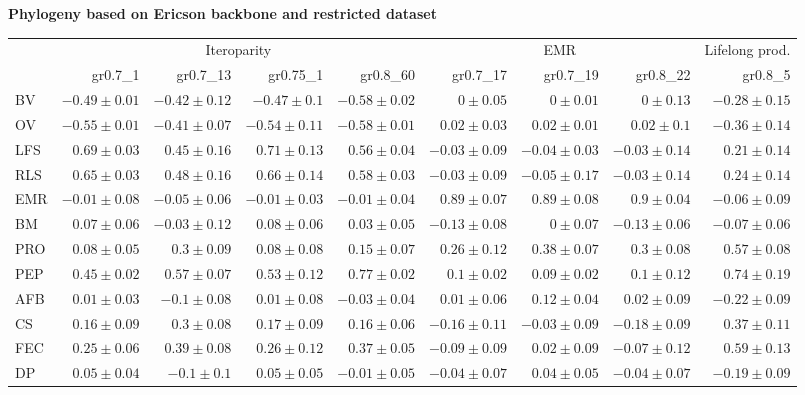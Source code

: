 \begin{landscape}
\begin{table}
\begin{footnotesize}
\textbf{Phylogeny based on Ericson backbone and restricted dataset}

\begin{tabular}{@{}l|rrrr|rrr|r@{}}
\toprule
 & \multicolumn{4}{c|}{Iteroparity} & \multicolumn{3}{c|}{EMR} & \multicolumn{1}{c}{Lifelong prod.}\\
 & gr0.7\_1 & gr0.7\_13 & gr0.75\_1 & gr0.8\_60 & gr0.7\_17 & gr0.7\_19 & gr0.8\_22 & gr0.8\_5\\
\midrule
BV & $-0.49 \pm 0.01$ & $-0.42 \pm 0.12$ & $-0.47 \pm 0.1$ & $-0.58 \pm 0.02$ & $0 \pm 0.05$ & $0 \pm 0.01$ & $0 \pm 0.13$ & $-0.28 \pm 0.15$\\
OV & $-0.55 \pm 0.01$ & $-0.41 \pm 0.07$ & $-0.54 \pm 0.11$ & $-0.58 \pm 0.01$ & $0.02 \pm 0.03$ & $0.02 \pm 0.01$ & $0.02 \pm 0.1$ & $-0.36 \pm 0.14$\\
LFS & $0.69 \pm 0.03$ & $0.45 \pm 0.16$ & $0.71 \pm 0.13$ & $0.56 \pm 0.04$ & $-0.03 \pm 0.09$ & $-0.04 \pm 0.03$ & $-0.03 \pm 0.14$ & $0.21 \pm 0.14$\\
RLS & $0.65 \pm 0.03$ & $0.48 \pm 0.16$ & $0.66 \pm 0.14$ & $0.58 \pm 0.03$ & $-0.03 \pm 0.09$ & $-0.05 \pm 0.17$ & $-0.03 \pm 0.14$ & $0.24 \pm 0.14$\\
EMR & $-0.01 \pm 0.08$ & $-0.05 \pm 0.06$ & $-0.01 \pm 0.03$ & $-0.01 \pm 0.04$ & $0.89 \pm 0.07$ & $0.89 \pm 0.08$ & $0.9 \pm 0.04$ & $-0.06 \pm 0.09$\\
BM & $0.07 \pm 0.06$ & $-0.03 \pm 0.12$ & $0.08 \pm 0.06$ & $0.03 \pm 0.05$ & $-0.13 \pm 0.08$ & $0 \pm 0.07$ & $-0.13 \pm 0.06$ & $-0.07 \pm 0.06$\\
PRO & $0.08 \pm 0.05$ & $0.3 \pm 0.09$ & $0.08 \pm 0.08$ & $0.15 \pm 0.07$ & $0.26 \pm 0.12$ & $0.38 \pm 0.07$ & $0.3 \pm 0.08$ & $0.57 \pm 0.08$\\
PEP & $0.45 \pm 0.02$ & $0.57 \pm 0.07$ & $0.53 \pm 0.12$ & $0.77 \pm 0.02$ & $0.1 \pm 0.02$ & $0.09 \pm 0.02$ & $0.1 \pm 0.12$ & $0.74 \pm 0.19$\\
AFB & $0.01 \pm 0.03$ & $-0.1 \pm 0.08$ & $0.01 \pm 0.08$ & $-0.03 \pm 0.04$ & $0.01 \pm 0.06$ & $0.12 \pm 0.04$ & $0.02 \pm 0.09$ & $-0.22 \pm 0.09$\\
CS & $0.16 \pm 0.09$ & $0.3 \pm 0.08$ & $0.17 \pm 0.09$ & $0.16 \pm 0.06$ & $-0.16 \pm 0.11$ & $-0.03 \pm 0.09$ & $-0.18 \pm 0.09$ & $0.37 \pm 0.11$\\
FEC & $0.25 \pm 0.06$ & $0.39 \pm 0.08$ & $0.26 \pm 0.12$ & $0.37 \pm 0.05$ & $-0.09 \pm 0.09$ & $0.02 \pm 0.09$ & $-0.07 \pm 0.12$ & $0.59 \pm 0.13$\\
DP & $0.05 \pm 0.04$ & $-0.1 \pm 0.1$ & $0.05 \pm 0.05$ & $-0.01 \pm 0.05$ & $-0.04 \pm 0.07$ & $0.04 \pm 0.05$ & $-0.04 \pm 0.07$ & $-0.19 \pm 0.09$\\

\end{tabular}
\end{footnotesize}
\end{table}
\end{landscape}
